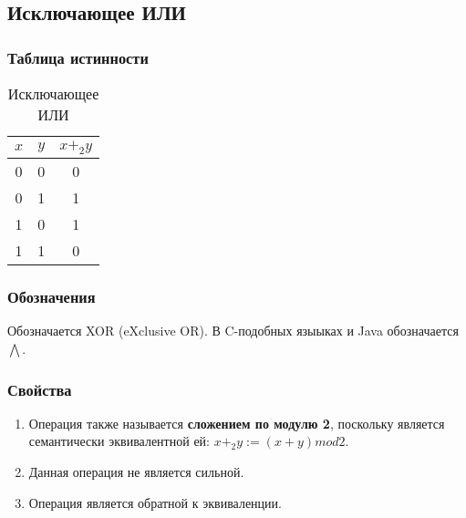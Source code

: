 \subsection{Исключающее ИЛИ} \label{xor}
\subsubsection{Таблица истинности}
\begin{table}[H]
	\begin{center}
		\begin{tabular}{|c|c|c|}
			\hline
			$x$ & $y$ & $x +_2 y$\\
			\hline
			0 & 0 & 0\\
			\hline
			0 & 1 & 1\\
			\hline
			1 & 0 & 1\\
			\hline
			1 & 1 & 0\\
			\hline
		\end{tabular}
		\caption{Исключающее ИЛИ}
	\end{center}
\end{table}

\subsubsection{Обозначения}
Обозначается XOR (eXclusive OR).
В C-подобных языыках и Java обозначается $\bigwedge$.

\subsubsection{Свойства}
\begin{enumerate}
	\item Операция также называется \textbf{сложением по модулю 2}, поскольку является семантически эквивалентной ей: $x +_2 y := (x + y) mod 2$.
	\item Данная операция не является сильной.
	\item Операция является обратной к эквиваленции.
\end{enumerate}

